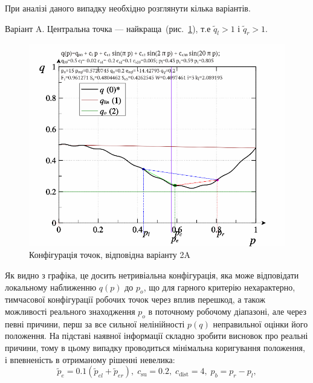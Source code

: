 При аналізі даного випадку необхідно розглянути кілька
варіантів.

Варіант A.\label{atu:d:p_eql_2A} %
%
Центральна точка --- найкраща~(рис.~\ref{atu:f:pq_2A}),
т.е $\tilde{q}_l > 1$ і $\tilde{q}_r > 1 $.

\begin{figure}[htb!]
  \begin{center}
    \includegraphics[width=60\TW]{p/pq_sin-p_pq_cgood.png}
  \end{center}
  \caption{Конфігурація точок, відповідна варіанту 2A}
  \label{atu:f:pq_2A}
\end{figure}

Як видно з графіка, це досить нетривіальна конфігурація, яка
може відповідати локальному наближенню
$q(p)$ до
$p_o$, що для гарного критерію нехарактерно, тимчасової
конфігурації робочих точок через вплив перешкод, а також
можливості реального знаходження
$p_o$ в поточному робочому діапазоні, але через певні причини,
перш за все сильної нелінійності
$p(q)$ неправильної оцінки його положення. На підставі наявної
інформації складно зробити висновок про реальні причини, тому
в цьому випадку проводиться мінімальна коригування положення,
і впевненість в отриманому рішенні невелика:
%
\begin{equation}
  \tilde{p}_e = 0.1 ( \tilde{p}_{el} + \tilde{p}_{er} ),
  \;
  c_\mathrm{su} = 0.2, \;  c_\mathrm{dist} = 4, \;   p_b = p_r - p_l,
  \label{atu:eq:pr_e_2A}
\end{equation}



